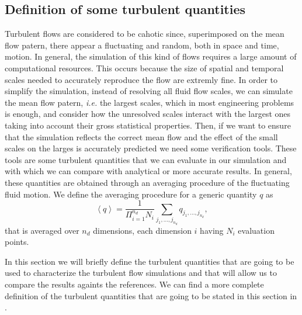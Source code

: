 \subsection{Definition of some turbulent quantities}
Turbulent flows are considered to be cahotic since, superimposed on the mean flow patern, there appear a fluctuating and random, both in space and time, motion. In general, the simulation of this kind of flows requires a large amount of computational resources. This occurs because the size of spatial and temporal scales needed to accurately reproduce the flow are extremly fine. In order to simplify the simulation, instead of resolving all fluid flow scales, we can simulate the mean flow patern, \textit{i.e.} the largest scales, which in most engineering problems is enough, and consider how the unresolved scales interact with the largest ones taking into account their gross statistical properties. Then, if we want to ensure that the simulation reflects the correct mean flow and the effect of the small scales on the larges is accurately predicted we need some verification tools. These tools are some turbulent quantities that we can evaluate in our simulation and with which we can compare with analytical or more accurate results. In general, these quantities are obtained through an averaging procedure of the fluctuating fluid motion. We define the averaging procedure for a generic quantity $q$ as
$$\left\langle q\right\rangle=\frac{1}{\Pi_{i=1}^{n_d}N_i}\sum_{j_1,...,j_{n_d}}q_{j_1,...,j_{n_d}},$$
that is averaged over $n_d$ dimensions, each dimension $i$ having $N_i$ evaluation points. 

In this section we will briefly define the turbulent quantities that are going to be used to characterize the turbulent flow simulations and that will allow us to compare the results againts the references. We can find a more complete definition of the turbulent quantities that are going to be stated in this section in \cite{orlandi,pope,davidson}.

